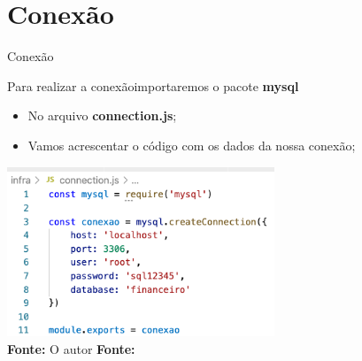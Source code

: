 \documentclass{beamer}
\begin{document}
\section{Conexão}
    \begin{frame}[label=lists]{Conexão}

         Para realizar a conexãoimportaremos o pacote \textbf{mysql}
         \begin{itemize}
         \item No arquivo \textbf{connection.js};
         \item Vamos acrescentar o código com os dados da nossa conexão;
         \end{itemize}
	            \includegraphics[width=80mm]{resources/aula6_3.png}\\
            \tiny{\textbf{Fonte:} O autor}
        \tiny{\textbf{Fonte:} \cite{moziladev2022}}
    \end{frame}
\end{document}
